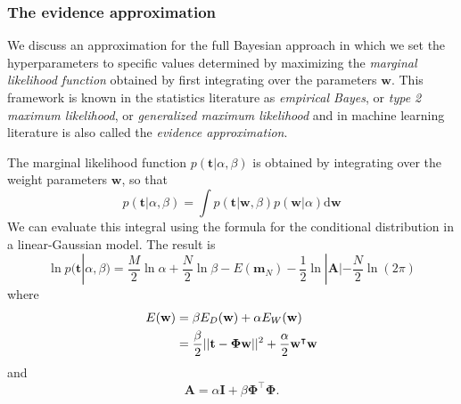 \documentclass[a4paper]{book}
\newcommand{\ud}{\mathrm{d}}
\renewcommand{\bf}{\mathbf}
\newcommand{\imp}[1]{\textit{#1}}
\newcommand{\bs}{\boldsymbol}
\begin{document}
\subsubsection{The evidence approximation}
We discuss an approximation for the full Bayesian approach in which we set the hyperparameters to specific values determined by maximizing the \imp{marginal likelihood function} obtained by first integrating over the parameters $\bf{w}$. This framework is known in the statistics literature as \imp{empirical Bayes}, or \imp{type 2 maximum likelihood}, or \imp{generalized maximum likelihood} and in machine learning literature is also called the \imp{evidence approximation}.

The marginal likelihood function $p(\bf{t}|\alpha,\beta)$ is obtained by integrating over the weight parameters $\bf{w}$, so that
\begin{equation}
	p(\bf{t}|\alpha,\beta) = \int p(\bf{t}|\bf{w},\beta) p(\bf{w}|\alpha) \ud \bf{w}
\end{equation}
We can evaluate this integral using the formula for the conditional distribution in a linear-Gaussian model. The result is
\begin{equation}
	\ln p(\bf{t}|\alpha,\beta) = \frac{M}{2} \ln \alpha + \frac{N}{2} \ln \beta - E(\bf{m}_N)-\frac{1}{2}\ln |\bf{A}| - \frac{N}{2}\ln(2 \pi)
\end{equation}
where
\begin{align}
	E(\bf{w}) &= \beta 	E_D(\bf{w}) + \alpha E_W(\bf{w}) \notag \\
	&= \frac{\beta}{2} ||\bf{t}-\bs{\Phi}\bf{w}||^2 + \frac{\alpha}{2} \bf{w}^{\intercal} \bf{w}
\end{align}
and
\begin{equation}
	\bf{A} = \alpha \bf{I} + \beta \bf{\Phi}^{\intercal} \bf{\Phi}.
\end{equation}
\end{document}
